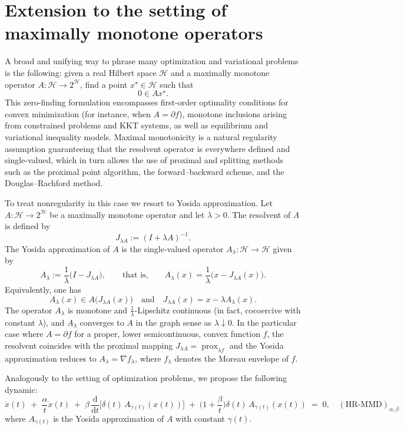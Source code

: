 \documentclass[11pt]{article}
\numberwithin{equation}{section}
\begin{document}
\section{Extension to the setting of maximally monotone operators}
A broad and unifying way to phrase many optimization and variational problems is the following: given a real Hilbert space $\mathcal{H}$ and a maximally monotone operator $A : \mathcal{H} \to 2^{\mathcal{H}}$, find a point $x^\star \in \mathcal{H}$ such that
\[
0 \in A x^\star .
\]
This zero-finding formulation encompasses first-order optimality conditions for convex minimization (for instance, when $A=\partial f$), monotone inclusions arising from constrained problems and KKT systems, as well as equilibrium and variational inequality models. Maximal monotonicity is a natural regularity assumption guaranteeing that the resolvent operator is everywhere defined and single-valued, which in turn allows the use of proximal and splitting methods such as the proximal point algorithm, the forward--backward scheme, and the Douglas--Rachford method.

To treat nonregularity in this case we resort to Yosida approximation. Let $A : \mathcal{H}\to 2^{\mathcal{H}}$ be a maximally monotone operator and let $\lambda>0$. The resolvent of $A$ is defined by
\[
J_{\lambda A} := (I+\lambda A)^{-1}.
\]
The Yosida approximation of $A$ is the single-valued operator $A_\lambda : \mathcal{H} \to \mathcal{H}$ given by
\[
A_\lambda := \frac{1}{\lambda}\bigl(I - J_{\lambda A}\bigr),
\qquad \text{that is,} \qquad
A_\lambda(x) = \frac{1}{\lambda}\bigl(x - J_{\lambda A}(x)\bigr).
\]
Equivalently, one has
\[
A_\lambda(x) \in A\bigl(J_{\lambda A}(x)\bigr)
\quad \text{and} \quad
J_{\lambda A}(x) = x - \lambda A_\lambda(x).
\]
The operator $A_\lambda$ is monotone and $\tfrac{1}{\lambda}$-Lipschitz continuous (in fact, cocoercive with constant $\lambda$), and $A_\lambda$ converges to $A$ in the graph sense as $\lambda \downarrow 0$. In the particular case where $A = \partial f$ for a proper, lower semicontinuous, convex function $f$, the resolvent coincides with the proximal mapping $J_{\lambda A} = \operatorname{prox}_{\lambda f}$ and the Yosida approximation reduces to $A_\lambda = \nabla f_\lambda$, where $f_\lambda$ denotes the Moreau envelope of $f$. 

Analogously to the setting of optimization problems, we propose the following dynamic:  
\begin{equation*}
\ddot x(t)\;+\;\frac{\alpha}{t}\dot x(t)\;+\;\beta\,\frac{\mathrm{d}}{\mathrm{d}t}\!\Big[\delta(t)\,A_{\gamma(t)}(x(t))\Big]
\;+\;\Big(1+\frac{\beta}{t}\Big)\delta(t)\,A_{\gamma(t)}(x(t))\;=\;0, \quad (\text{HR-MMD})_{\alpha,\beta}
\end{equation*}
where $A_{\gamma(t)}$ is the Yosida approximation of $A$ with constant $\gamma(t)$.
\end{document}
